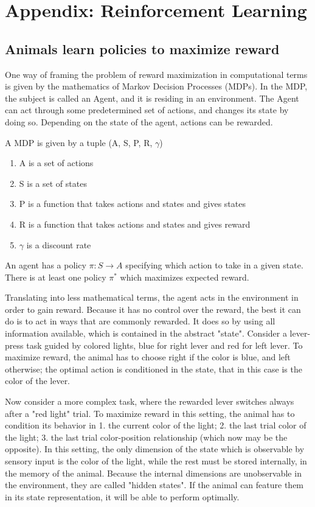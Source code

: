 \chapter*{Appendix: Reinforcement Learning}

\section{Animals learn policies to maximize reward}
    One way of framing the problem of reward maximization in computational terms is given by the mathematics of Markov Decision Processes (MDPs). In the MDP, the subject is called an Agent, and it is residing in an environment. The Agent can act through some predetermined set of actions, and changes its state by doing so. Depending on the state of the agent, actions can be rewarded.
    
    A MDP is given by a tuple (A, S, P, R, $\gamma$)
    \begin{enumerate}
        \item A is a set of actions
        \item S is a set of states
        \item P is a function that takes actions and states and gives states
        \item R is a function that takes actions and states and gives reward
        \item $\gamma$ is a discount rate
    \end{enumerate}
    
    An agent has a policy $\pi : S \rightarrow A $ specifying which action to take in a given state. There is at least one policy $\pi^*$ which maximizes expected reward.
    
    Translating into less mathematical terms, the agent acts in the environment in order to gain reward. Because it has no control over the reward, the best it can do is to act in ways that are commonly rewarded. It does so by using all information available, which is contained in the abstract "state". Consider a lever-press task guided by colored lights, blue for right lever and red for left lever. To maximize reward, the animal has to choose right if the color is blue, and left otherwise; the optimal action is conditioned in the state, that in this case is the color of the lever. 
    
    Now consider a more complex task, where the rewarded lever switches always after a "red light" trial. To maximize reward in this setting, the animal has to condition its behavior in 1. the current color of the light; 2. the last trial color of the light; 3. the last trial color-position relationship (which now may be the opposite). In this setting, the only dimension of the state which is observable by sensory input is the color of the light, while the rest must be stored internally, in the memory of the animal. Because the internal dimensions are unobservable in the environment, they are called "hidden states". If the animal can feature them in its state representation, it will be able to perform optimally.
    
